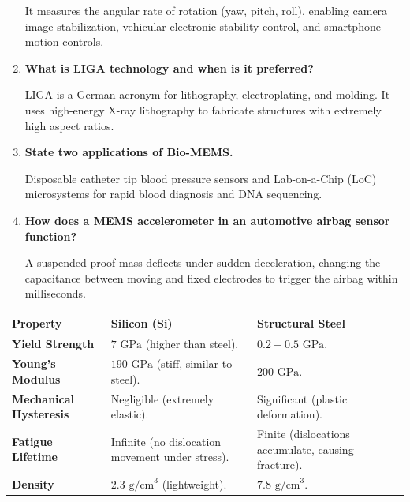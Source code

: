 \documentclass[12pt,a4paper]{article}
\newcommand{\Q}[1]{\textbf{#1}\par\noindent\ignorespaces}
\renewcommand{\arraystretch}{1.45}
\begin{document}
\begin{tcolorbox}[exambox, title={\textbf{Frequently Asked / Viva Questions}}]
\begin{enumerate}[topsep=0pt, label=\textbf{Q\arabic*.}, itemsep=5pt]
    It measures the angular rate of rotation (yaw, pitch, roll), enabling camera image stabilization, vehicular electronic stability control, and smartphone motion controls.
  \item \Q{What is LIGA technology and when is it preferred?}
    LIGA is a German acronym for lithography, electroplating, and molding. It uses high-energy X-ray lithography to fabricate structures with extremely high aspect ratios.
  \item \Q{State two applications of Bio-MEMS.}
    Disposable catheter tip blood pressure sensors and Lab-on-a-Chip (LoC) microsystems for rapid blood diagnosis and DNA sequencing.
  \item \Q{How does a MEMS accelerometer in an automotive airbag sensor function?}
    A suspended proof mass deflects under sudden deceleration, changing the capacitance between moving and fixed electrodes to trigger the airbag within milliseconds.
\end{enumerate}
\end{tcolorbox}

\begin{tcolorbox}[tikzbox, title={Comparison: Silicon (MEMS) vs. Steel (Macro-engineering)}]
\renewcommand{\arraystretch}{1.45}
\par\noindent
\begin{tabularx}{\linewidth}{|B{3.2cm}|Y|Y|}
\hline
\textbf{Property} & \textbf{\color{myteal}Silicon (Si)} & \textbf{\color{myamber}Structural Steel} \\
\hline
\textbf{Yield Strength} & $7\text{ GPa}$ (higher than steel). & $0.2 - 0.5\text{ GPa}$. \\
\hline
\textbf{Young's Modulus} & $190\text{ GPa}$ (stiff, similar to steel). & $200\text{ GPa}$. \\
\hline
\textbf{Mechanical Hysteresis} & Negligible (extremely elastic). & Significant (plastic deformation). \\
\hline
\textbf{Fatigue Lifetime} & Infinite (no dislocation movement under stress). & Finite (dislocations accumulate, causing fracture). \\
\hline
\textbf{Density} & $2.3\text{ g/cm}^3$ (lightweight). & $7.8\text{ g/cm}^3$. \\
\hline
\end{tabularx}
\end{tcolorbox}
\end{document}
